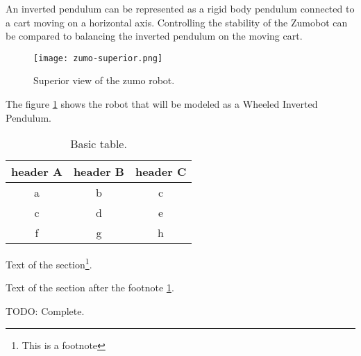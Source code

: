 An inverted pendulum can be represented as a rigid body pendulum connected to a cart moving on a horizontal axis. Controlling the stability of the Zumobot can be compared to balancing the inverted pendulum on the moving cart.


\begin{figure}[h]
	\centering
	\texttt{[image: zumo-superior.png]}
	\caption{Superior view of the zumo robot.}
	\label{fig:sup-zumo}
\end{figure}

The figure \ref{fig:sup-zumo} shows the robot that will be modeled as a Wheeled Inverted Pendulum.

\begin{table}[h]
	\centering
	\caption{Basic table.}
	\label{tab:tab1}
	\begin{tabular}{ccc}
		\toprule
		header A & header B & header C\\
		\midrule
		a & b & c\\
		c & d & e\\
		f & g & h\\
		\bottomrule
	\end{tabular}
\end{table}

Text of the section\footnote{\label{fn1}This is a footnote}.

Text of the section after the footnote \ref{fn1}.

TODO: Complete.
